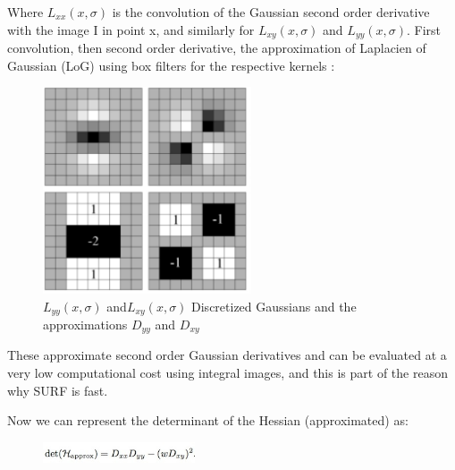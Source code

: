Where ${L_{xx}(x,\sigma)}$ is the convolution of the Gaussian second order derivative with the image I in point x, and similarly for ${L_{xy}(x,\sigma)}$ and ${L_{yy}(x,\sigma)}$.
First convolution, then second order derivative, the approximation  of Laplacien of Gaussian  (LoG) using box filters for  the respective kernels :

\begin{figure}[H]
\centering
\includegraphics[width=0.55\textwidth]{img/surf4.PNG}
\caption{${L_{yy}(x,\sigma)}$ and${L_{xy}(x,\sigma)}$ Discretized
Gaussians and the approximations $D_{yy}$ and $D_{xy}$}
\label{fig:surf1}
\end{figure}


These approximate second order Gaussian derivatives and can be evaluated at a very low computational cost using integral images, and this is part of the reason why SURF is fast.

Now we can represent the determinant of the Hessian (approximated) as:

\begin{figure}[H]
\centering
\includegraphics[width= 0.4\textwidth]{img/det.jpeg}

\label{fig:surfdet}
\end{figure}

